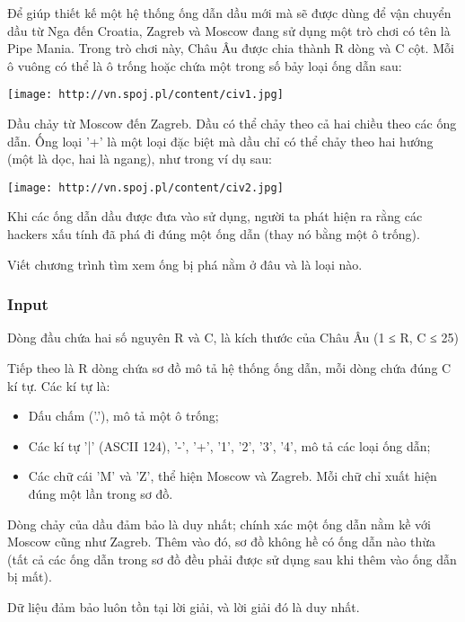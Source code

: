 







   Để giúp thiết kế một hệ thống ống dẫn dầu mới mà sẽ được dùng để vận chuyển dầu từ Nga đến Croatia, Zagreb và Moscow đang sử dụng một trò chơi có tên là Pipe Mania. Trong trò chơi này, Châu Âu được chia thành R dòng và C cột. Mỗi ô vuông có thể là ô trống hoặc chứa một trong số bảy loại ống dẫn sau:  


\texttt{[image: http://vn.spoj.pl/content/civ1.jpg]}

   Dầu chảy từ Moscow đến Zagreb. Dầu có thể chảy theo cả hai chiều theo các ống dẫn. Ống loại '+' là một loại đặc biệt mà dầu chỉ có thể chảy theo hai hướng (một là dọc, hai là ngang), như trong ví dụ sau:  


\texttt{[image: http://vn.spoj.pl/content/civ2.jpg]}

   Khi các ống dẫn dầu được đưa vào sử dụng, người ta phát hiện ra rằng các hackers xấu tính đã phá đi đúng một ống dẫn (thay nó bằng một ô trống).  

   Viết chương trình tìm xem ống bị phá nằm ở đâu và là loại nào.  

\subsubsection{   Input  }

   Dòng đầu chứa hai số nguyên R và C, là kích thước của Châu Âu (1 ≤ R, C ≤ 25)  

   Tiếp theo là R dòng chứa sơ đồ mô tả hệ thống ống dẫn, mỗi dòng chứa đúng C kí tự. Các kí tự là:  
\begin{itemize}
	\item     Dấu chấm ('.'), mô tả một ô trống;   
	\item     Các kí tự '|' (ASCII 124), '-', '+', '1', '2', '3', '4', mô tả các loại ống dẫn;   
	\item     Các chữ cái 'M' và 'Z', thể hiện Moscow và Zagreb. Mỗi chữ chỉ xuất hiện đúng một lần trong sơ đồ.   
\end{itemize}

   Dòng chảy của dầu đảm bảo là duy nhất; chính xác một ống dẫn nằm kề với Moscow cũng như Zagreb. Thêm vào đó, sơ đồ không hề có ống dẫn nào thừa (tất cả các ống dẫn trong sơ đồ đều phải được sử dụng sau khi thêm vào ống dẫn bị mất).  

   Dữ liệu đảm bảo luôn tồn tại lời giải, và lời giải đó là duy nhất.  

